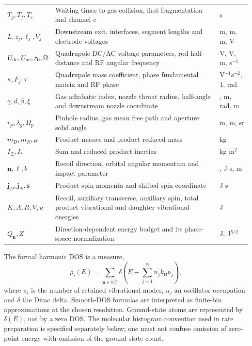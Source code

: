\documentclass[10pt,a4paper]{article}
\newcommand{\kb}{k_{\mathrm B}}
\begin{document}
\begin{longtable}{@{}p{}p{}>{\raggedright\arraybackslash}p{}@{}}
$T_g,T_f,T_c$ & Waiting times to gas collision, first fragmentation and channel $c$ & s\\
$L,z_j,\ell_j,V_j$ & Downstream exit, interfaces, segment lengths and electrode voltages & m, m, m, V\\
$U_{\rm dc},U_{\rm ac},r_0,\Omega$ & Quadrupole DC/AC voltage parameters, rod half-distance and RF angular frequency & V, V, m, s$^{-1}$\\
$\kappa,F_j,\tau$ & Quadrupole mass coefficient, phase fundamental matrix and RF phase & V$^{-1}$s$^{-2}$, 1, rad\\
$\gamma,d,\beta,\xi$ & Gas adiabatic index, nozzle throat radius, half-angle and downstream nozzle coordinate & 1, m, rad, m\\
$r_p,\lambda_g,\Omega_p$ & Pinhole radius, gas mean free path and aperture solid angle & m, m, sr\\
$m_D,m_N,\mu$ & Product masses and product reduced mass & kg\\
$I_\Sigma,I_*$ & Sum and reduced product inertias & kg m$^2$\\
$\mathbf n,\boldsymbol\ell,b$ & Recoil direction, orbital angular momentum and impact parameter & 1, J s, m\\
$\mathbf j_D,\mathbf j_N,\mathbf s$ & Product spin momenta and shifted spin coordinate & J s\\
$K,A,R,V,u$ & Recoil, auxiliary transverse, auxiliary spin, total product vibrational and daughter vibrational energies & J\\
$Q_{\mathbf n},Z$ & Direction-dependent energy budget and its phase-space normalization & J, J$^{5/2}$\\
\bottomrule
\end{longtable}
\endgroup

The formal harmonic DOS is a measure,
\begin{equation}
 \rho_i(E)=\sum_{\mathbf n\in\mathbb N_0^{s_i}}
 \delta\!\left(E-\sum_{j=1}^{s_i}n_j\kb\nu_j\right),\label{eq:formalDOS}
\end{equation}
where $s_i$ is the number of retained vibrational modes, $n_j$ an oscillator
occupation and $\delta$ the Dirac delta. Smooth-DOS formulas are interpreted as
finite-bin approximations at the chosen resolution. Ground-state atoms are
represented by $\delta(E)$, not by a zero DOS. The molecular histogram convention
used in rate preparation is specified separately below; one must not confuse
omission of zero-point energy with omission of the ground-state count.
\end{document}
